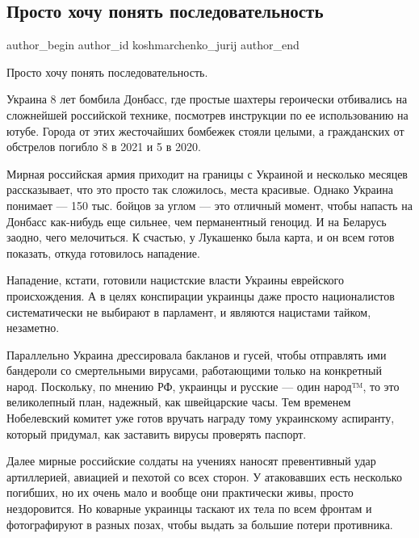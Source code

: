  
 
 
 
 
 
\subsection{Просто хочу понять последовательность}
\label{sec:12_04_2022.fb.koshmarchenko_jurij.1.posledovatelnost}
 
\ifcmt
 author_begin
   author_id koshmarchenko_jurij
 author_end
\fi

Просто хочу понять последовательность.

Украина 8 лет бомбила Донбасс, где простые шахтеры героически отбивались на
сложнейшей российской технике, посмотрев инструкции по ее использованию на
ютубе. Города от этих жесточайших бомбежек стояли целыми, а гражданских от
обстрелов погибло 8 в 2021 и 5 в 2020.

Мирная российская армия приходит на границы с Украиной и несколько месяцев
рассказывает, что это просто так сложилось, места красивые. Однако Украина
понимает — 150 тыс. бойцов за углом — это отличный момент, чтобы напасть на
Донбасс как-нибудь еще сильнее, чем перманентный геноцид. И на Беларусь заодно,
чего мелочиться. К счастью, у Лукашенко была карта, и он всем готов показать,
откуда готовилось нападение.

Нападение, кстати, готовили нацистские власти Украины еврейского происхождения.
А в целях конспирации украинцы даже просто националистов систематически не
выбирают в парламент, и являются нацистами тайком, незаметно.

Параллельно Украина дрессировала бакланов и гусей, чтобы отправлять ими
бандероли со смертельными вирусами, работающими только на конкретный народ.
Поскольку, по мнению РФ, украинцы и русские — один народ™, то это великолепный
план, надежный, как швейцарские часы. Тем временем Нобелевский комитет уже
готов вручать награду тому украинскому аспиранту, который придумал, как
заставить вирусы проверять паспорт.

Далее мирные российские солдаты на учениях наносят превентивный удар
артиллерией, авиацией и пехотой со всех сторон. У атаковавших есть несколько
погибших, но их очень мало и вообще они практически живы, просто нездоровится.
Но коварные украинцы таскают их тела по всем фронтам и фотографируют в разных
позах, чтобы выдать за большие потери противника.

